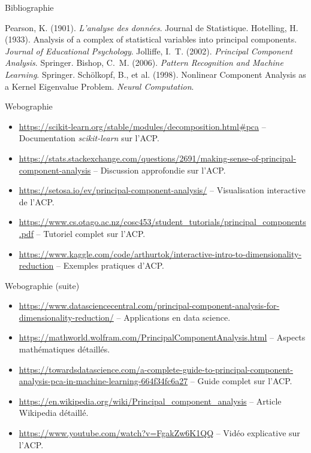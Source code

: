 \documentclass{beamer}
\begin{document}
\begin{frame}[allowframebreaks]{Bibliographie}
\tiny
\begin{thebibliography}{9}
 Pearson, K. (1901). \textit{L'analyse des données}. Journal de Statistique.
 Hotelling, H. (1933). Analysis of a complex of statistical variables into principal components. \textit{Journal of Educational Psychology}.
 Jolliffe, I.~T. (2002). \textit{Principal Component Analysis}. Springer.
 Bishop, C.~M. (2006). \textit{Pattern Recognition and Machine Learning}. Springer.
 Schölkopf, B., et al. (1998). Nonlinear Component Analysis as a Kernel Eigenvalue Problem. \textit{Neural Computation}.
\end{thebibliography}
\end{frame}

\begin{frame}[t,fragile]{Webographie}
\footnotesize
\begin{itemize}
    \item \url{https://scikit-learn.org/stable/modules/decomposition.html#pca} -- Documentation \textit{scikit-learn} sur l'ACP.
    \item \url{https://stats.stackexchange.com/questions/2691/making-sense-of-principal-component-analysis} -- Discussion approfondie sur l'ACP.
    \item \url{https://setosa.io/ev/principal-component-analysis/} -- Visualisation interactive de l'ACP.
    \item \url{https://www.cs.otago.ac.nz/cosc453/student_tutorials/principal_components.pdf} -- Tutoriel complet sur l'ACP.
    \item \url{https://www.kaggle.com/code/arthurtok/interactive-intro-to-dimensionality-reduction} -- Exemples pratiques d'ACP.
\end{itemize}
\end{frame}


\begin{frame}{Webographie (suite)}
\footnotesize
\begin{itemize}
    \item \url{https://www.datasciencecentral.com/principal-component-analysis-for-dimensionality-reduction/} -- Applications en data science.
    \item \url{https://mathworld.wolfram.com/PrincipalComponentAnalysis.html} -- Aspects mathématiques détaillés.
    \item \url{https://towardsdatascience.com/a-complete-guide-to-principal-component-analysis-pca-in-machine-learning-664f34fc6a27} -- Guide complet sur l'ACP.
    \item \url{https://en.wikipedia.org/wiki/Principal_component_analysis} -- Article Wikipedia détaillé.
    \item \url{https://www.youtube.com/watch?v=FgakZw6K1QQ} -- Vidéo explicative sur l'ACP.
\end{itemize}
\end{frame}
\end{document}
